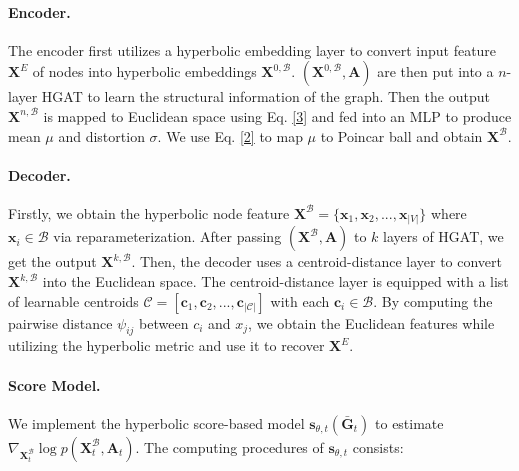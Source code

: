 \documentclass[letterpaper]{article} %
\begin{document}
\paragraph{Encoder.}The encoder first utilizes a hyperbolic embedding layer to convert input feature$\boldsymbol{X}^E$ of nodes into hyperbolic embeddings $\boldsymbol{X}^{0,\mathcal{B}}$. $(\boldsymbol{X}^{0,\mathcal{B}},\boldsymbol{A})$ are then put into a $n$-layer HGAT to learn the structural information of the graph. Then the output $\boldsymbol{X}^{n,\mathcal{B}}$ is mapped to Euclidean space using Eq. \eqref{3} and fed into an MLP to produce mean $\mu$ and distortion $\sigma$.
We use Eq. \eqref{2} to map $\mu$ to Poincar ball and obtain $\boldsymbol{X}^\mathcal{B}$.

\paragraph{Decoder.}
Firstly, we obtain the hyperbolic node feature $\boldsymbol{X}^{\mathcal{B}}=\{\boldsymbol{x}_1,\boldsymbol{x}_2,...,\boldsymbol{x}_{|V|}\}$ where $\boldsymbol{x}_{i}\in \mathcal{B}$ via reparameterization.
After passing $(\boldsymbol{X}^{\mathcal{B}},\boldsymbol{A})$ to $k$ layers of HGAT, we get the output $\boldsymbol{X}^{k,\mathcal{B}}$. Then, the decoder uses a centroid-distance layer \cite{liu2019hyperbolic} to convert $\boldsymbol{X}^{k,\mathcal{B}}$ into the Euclidean space.
The centroid-distance layer is equipped with a list of learnable centroids $\mathcal{C}=[\boldsymbol{c}_1,\boldsymbol{c}_2,...,\boldsymbol{c}_{|\mathcal{C}|}]$ with each $\boldsymbol{c}_{i}\in \mathcal{B}$.
By computing the pairwise distance $\psi_{ij}$ between $c_i$ and $x_j$, we obtain the Euclidean features while utilizing the hyperbolic metric and use it to recover $\boldsymbol{X}^{E}$.

\paragraph{Score Model.}
We implement the hyperbolic score-based model $\boldsymbol{s}_{\theta, t}(\boldsymbol{\bar{G}}_{t})$ to estimate $\nabla_{\boldsymbol{X}^\mathcal{B}_{t}} \log p\left(\boldsymbol{X}^\mathcal{B}_{t},\boldsymbol{A}_{t} \right)$. The computing procedures of $\boldsymbol{s}_{\theta, t}$ consists:
\end{document}
